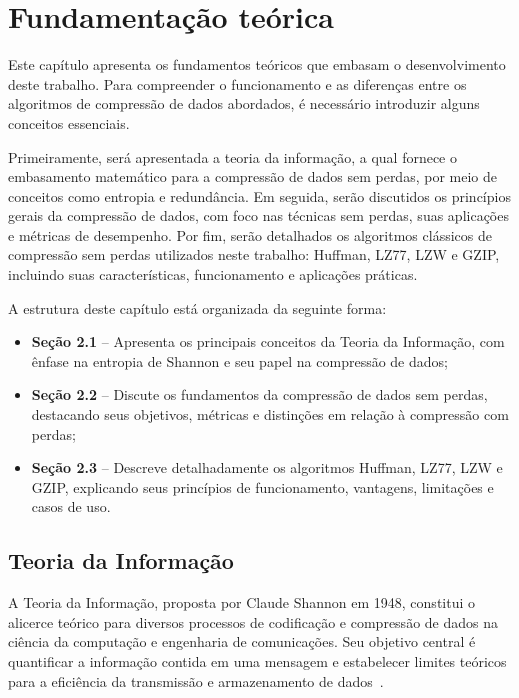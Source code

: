 \chapter{Fundamentação teórica}
\label{c.fundamentacao_teorica}

Este capítulo apresenta os fundamentos teóricos que embasam o desenvolvimento deste trabalho. Para compreender o funcionamento e as diferenças entre os algoritmos de compressão de dados abordados, é necessário introduzir alguns conceitos essenciais.

Primeiramente, será apresentada a teoria da informação, a qual fornece o embasamento matemático para a compressão de dados sem perdas, por meio de conceitos como entropia e redundância. Em seguida, serão discutidos os princípios gerais da compressão de dados, com foco nas técnicas sem perdas, suas aplicações e métricas de desempenho. Por fim, serão detalhados os algoritmos clássicos de compressão sem perdas utilizados neste trabalho: Huffman, LZ77, LZW e GZIP, incluindo suas características, funcionamento e aplicações práticas.

A estrutura deste capítulo está organizada da seguinte forma:

\begin{itemize}
    \item \textbf{Seção 2.1} -- Apresenta os principais conceitos da Teoria da Informação, com ênfase na entropia de Shannon e seu papel na compressão de dados;
    \item \textbf{Seção 2.2} -- Discute os fundamentos da compressão de dados sem perdas, destacando seus objetivos, métricas e distinções em relação à compressão com perdas;
    \item \textbf{Seção 2.3} -- Descreve detalhadamente os algoritmos Huffman, LZ77, LZW e GZIP, explicando seus princípios de funcionamento, vantagens, limitações e casos de uso.
\end{itemize}

\section{Teoria da Informação}
\label{sec:teoria-da-informacao}
A Teoria da Informação, proposta por Claude Shannon em 1948, constitui o alicerce teórico para diversos processos de codificação e compressão de dados na ciência da computação e engenharia de comunicações. Seu objetivo central é quantificar a informação contida em uma mensagem e estabelecer limites teóricos para a eficiência da transmissão e armazenamento de dados~\cite{shannon1948}.

